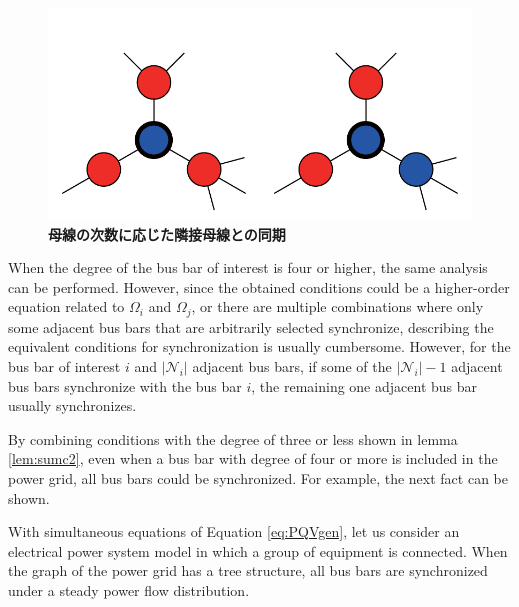 \documentclass[tombow,dvipdfmx]{corona-a5-1.1}
\begin{document}
\begin{figure}[t]
{  \label{fig:N2}
  \begin{minipage}{0.48\linewidth}
    \centering
    \includegraphics[width = .85\linewidth]{figs/3degbus}
  \end{minipage}
  \medskip
  \caption{\textbf{母線の次数に応じた隣接母線との同期}}
  \label{fig:bussync}
  }
\medskip
\end{figure}
When the degree of the bus bar of interest is four or higher, the same analysis can be performed.
However, since the obtained conditions could be a higher-order equation related to $\Omega_i$ and $\Omega_j$, or there are multiple combinations where only some adjacent bus bars that are arbitrarily selected synchronize, describing the equivalent conditions for synchronization is usually cumbersome.
However, for the bus bar of interest $i$ and $|\mathcal{N}_i|$ adjacent bus bars, if some of the $|\mathcal{N}_i |-1$ adjacent bus bars synchronize with the bus bar $i$, the remaining one adjacent bus bar usually synchronizes. 

By combining conditions with the degree of three or less shown in lemma \ref{lem:sumc2}, even when a bus bar with degree of four or more is included in the power grid, all bus bars could be synchronized.
For example, the next fact can be shown.

\begin{定理}
\label{thm:tree}
With simultaneous equations of Equation \ref{eq:PQVgen}, let us consider an electrical power system model in which a group of equipment is connected.
When the graph of the power grid has a tree structure, all bus bars are synchronized under a steady power flow distribution.
\end{定理}
\end{document}
